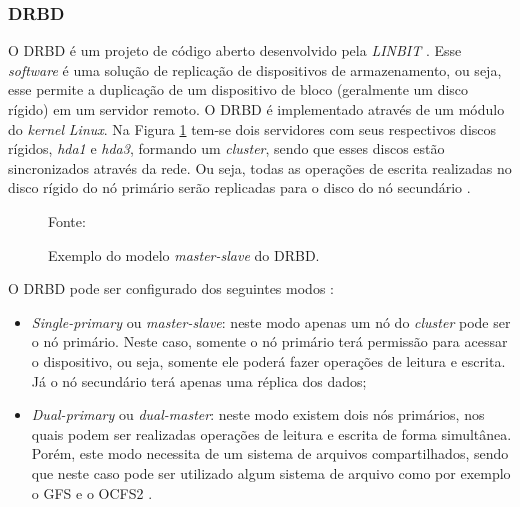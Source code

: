 \subsubsection{DRBD}
\label{section:drbd}
O \ac{DRBD} é um projeto de código aberto desenvolvido pela \textit{LINBIT} \cite{drbd}.
Esse \textit{software} é uma solução de replicação de dispositivos de armazenamento, ou seja, esse permite a duplicação de um dispositivo de bloco 
(geralmente um disco rígido) em um servidor remoto. O \ac{DRBD} é implementado através de um módulo do \textit{kernel} \textit{Linux}. 
Na Figura \ref{fig:drbd_basic} tem-se dois servidores com seus respectivos discos rígidos, \textit{hda1} e 
\textit{hda3}, formando um \textit{cluster}, sendo que esses discos estão sincronizados através da rede. Ou seja, todas as operações de escrita 
realizadas no disco rígido do nó primário serão replicadas para o disco do nó secundário \cite{zaminhani2008}.

\begin{figure}[h!]
 \centering
 \caption{Exemplo do modelo \textit{master-slave} do \ac{DRBD}.}
 Fonte: \citet{jones2010}
 \label{fig:drbd_basic}
\end{figure}

O \ac{DRBD} pode ser configurado dos seguintes modos \cite{drbd}:
\begin{itemize}
 \item \textit{Single-primary} ou \textit{master-slave}: neste modo apenas um nó do \textit{cluster} pode ser o nó primário. Neste caso, somente
 o nó primário terá permissão para acessar o dispositivo, ou seja, somente ele poderá fazer operações de leitura e escrita. Já o nó 
 secundário terá apenas uma réplica dos dados;
 \item \textit{Dual-primary} ou \textit{dual-master}: neste modo existem dois nós primários, nos quais podem ser realizadas operações de leitura e 
 escrita de forma simultânea. Porém, este modo necessita de um sistema de arquivos compartilhados, sendo que neste caso pode ser utilizado algum 
 sistema de arquivo como por exemplo o \ac{GFS} \cite{gfs} e o \ac{OCFS2} \cite{ocfs2}.
\end{itemize}

